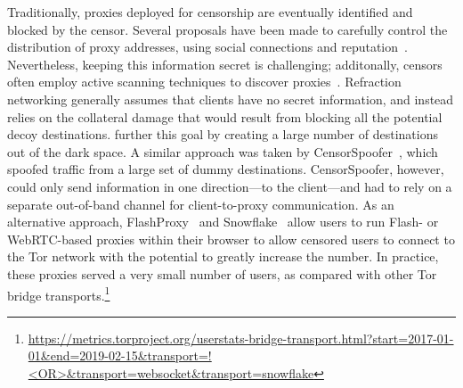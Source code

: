 Traditionally, proxies deployed for censorship are eventually identified and blocked by the censor. Several proposals have been made to carefully control  the distribution of proxy addresses, using social connections and reputation~\cite{proximax,rbridge,salmon}. Nevertheless, keeping this information secret is challenging; additonally, censors often employ active scanning techniques to discover proxies~\cite{Dunna2018a}. Refraction networking generally assumes that clients have no secret information, and instead relies on the  collateral damage that would result from blocking all the potential decoy destinations. \scheme further this goal by creating a large number of destinations out of the dark space. A similar approach was taken by CensorSpoofer~\cite{censorspoofer}, which spoofed traffic from a large set of dummy destinations. CensorSpoofer, however, could only send information in one direction---to the client---and had to rely on a separate out-of-band channel for client-to-proxy communication. As an alternative approach, FlashProxy~\cite{flash-proxies} and Snowflake~\cite{snowflake} allow users to run Flash- or WebRTC-based proxies within their browser to allow censored users to connect to the Tor network with the potential to greatly increase the number. In practice, these proxies served a very small number of users, as compared with other Tor bridge transports.\footnote{\url{https://metrics.torproject.org/userstats-bridge-transport.html?start=2017-01-01&end=2019-02-15&transport=!<OR>&transport=websocket&transport=snowflake}}
